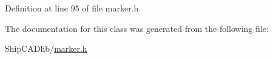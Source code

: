 Definition at line 95 of file marker.\-h.



The documentation for this class was generated from the following file\-:\begin{DoxyCompactItemize}
\item 
Ship\-C\-A\-Dlib/\hyperlink{marker_8h}{marker.\-h}\end{DoxyCompactItemize}
